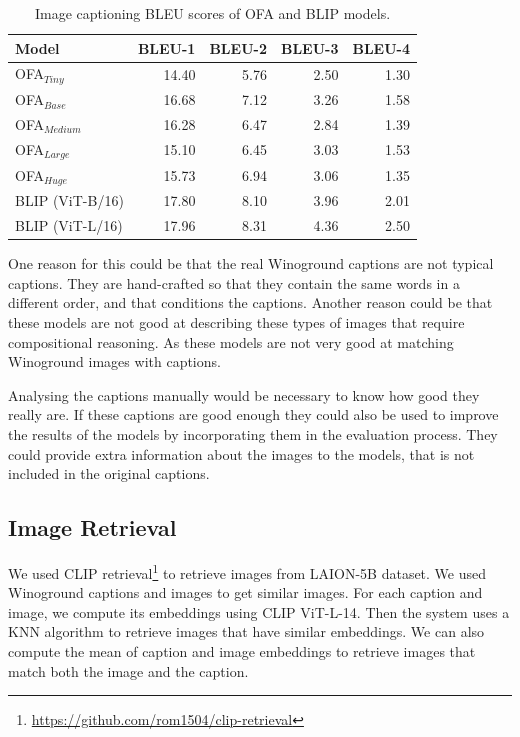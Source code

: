 \begin{table}[ht]
    \centering
    \begin{tabular}{lrrrr}
    \toprule
    Model &  BLEU-1 &  BLEU-2 &  BLEU-3 &  BLEU-4 \\
    \midrule
    OFA$_{Tiny}$    &   14.40 &    5.76 &    2.50 &    1.30 \\
    OFA$_{Base}$    &   16.68 &    7.12 &    3.26 &    1.58 \\
    OFA$_{Medium}$  &   16.28 &    6.47 &    2.84 &    1.39 \\
    OFA$_{Large}$   &   15.10 &    6.45 &    3.03 &    1.53 \\
    OFA$_{Huge}$    &   15.73 &    6.94 &    3.06 &    1.35 \\
    BLIP (ViT-B/16) &   17.80 &    8.10 &    3.96 &    2.01 \\
    BLIP (ViT-L/16) &   17.96 &    8.31 &    4.36 &    2.50 \\
    \bottomrule
    \end{tabular}
    \caption{Image captioning BLEU scores of OFA and BLIP models.}
    \label{tab:bleu_scores}
\end{table}

One reason for this could be that the real Winoground captions are not typical captions. They are hand-crafted so that they contain the same words in a different order, and that conditions the captions. Another reason could be that these models are not good at describing these types of images that require compositional reasoning. As these models are not very good at matching Winoground images with captions.

Analysing the captions manually would be necessary to know how good they really are. If these captions are good enough they could also be used to improve the results of the models by incorporating them in the evaluation process. They could provide extra information about the images to the models, that is not included in the original captions.

\subsection{Image Retrieval} \label{image_retrieval}

We used CLIP retrieval\footnote{\url{https://github.com/rom1504/clip-retrieval}} to retrieve images from LAION-5B \cite{schuhmann2022laionb} dataset. We used Winoground captions and images to get similar images. For each caption and image, we compute its embeddings using CLIP ViT-L-14. Then the system uses a KNN algorithm to retrieve images that have similar embeddings. We can also compute the mean of caption and image embeddings to retrieve images that match both the image and the caption. 

